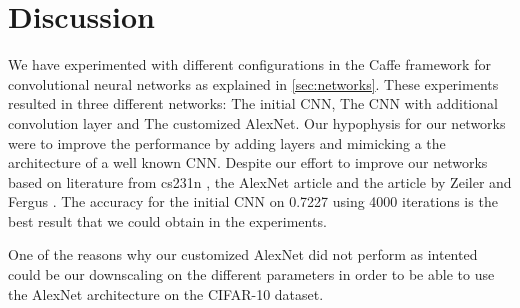 \graphicspath{{Chapters/Project/}}

\section{Discussion} %
\label{sec:discussion}

We have experimented with different configurations in the Caffe framework for
convolutional neural networks as explained in \autoref{sec:networks}. These
experiments resulted in three different networks: The initial CNN, The CNN with
additional convolution layer and The customized AlexNet. Our hypophysis for our
networks were to improve the performance by adding layers and mimicking
a the architecture of a well known CNN. Despite our effort to improve our
networks based on literature from cs231n \cite{cs231n}, the AlexNet
article\cite{AlexNet} and the article by Zeiler and Fergus \cite{ZeilerFergus}. 
The accuracy for the initial CNN on 0.7227 using 4000 iterations is the best
result that we could obtain in the experiments.


One of the reasons why our customized AlexNet did not perform as intented could
be our downscaling on the different parameters in order to be able to use the
AlexNet architecture on the CIFAR-10 dataset. 

